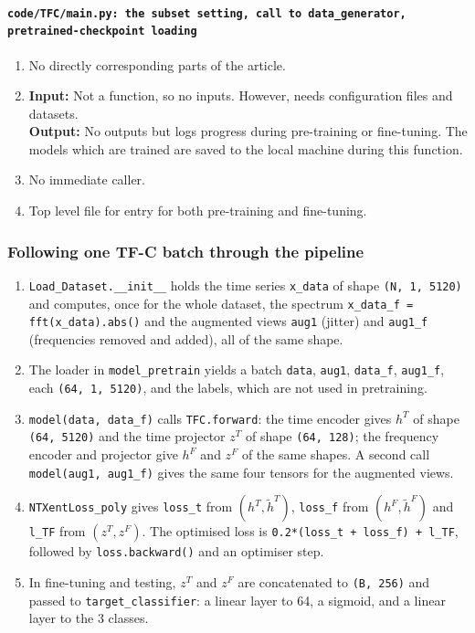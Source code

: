 \documentclass[a4paper,11pt]{article}
\newcommand{\code}[1]{\texttt{#1}}
\begin{document}
\paragraph{\code{code/TFC/main.py: the \code{subset} setting, call to \code{data\_generator}, pretrained-checkpoint loading}}
\begin{enumerate}[label=(\roman*)]
\item No directly corresponding parts of the article.
\item 
    \textbf{Input:} Not a function, so no inputs. However, needs configuration files and datasets.\\
    \textbf{Output:} No outputs but logs progress during pre-training or fine-tuning. The models which are trained are saved to the local machine during this function.
\item No immediate caller.
\item Top level file for entry for both pre-training and fine-tuning.
\end{enumerate}

\subsubsection{Following one TF-C batch through the pipeline}
\begin{enumerate}
\item \code{Load\_Dataset.\_\_init\_\_} holds the time series \code{x\_data} of shape \texttt{(N, 1, 5120)} and computes, once for the whole dataset, the spectrum \code{x\_data\_f = fft(x\_data).abs()} and the augmented views \code{aug1} (jitter) and \code{aug1\_f} (frequencies removed and added), all of the same shape.
\item The loader in \code{model\_pretrain} yields a batch \code{data}, \code{aug1}, \code{data\_f}, \code{aug1\_f}, each \texttt{(64, 1, 5120)}, and the labels, which are not used in pretraining.
\item \code{model(data, data\_f)} calls \code{TFC.forward}: the time encoder gives $h^T$ of shape \texttt{(64, 5120)} and the time projector $z^T$ of shape \texttt{(64, 128)}; the frequency encoder and projector give $h^F$ and $z^F$ of the same shapes. A second call \code{model(aug1, aug1\_f)} gives the same four tensors for the augmented views.
\item \code{NTXentLoss\_poly} gives \code{loss\_t} from $(h^T, \tilde{h}^T)$, \code{loss\_f} from $(h^F, \tilde{h}^F)$ and \code{l\_TF} from $(z^T, z^F)$. The optimised loss is \code{0.2*(loss\_t + loss\_f) + l\_TF}, followed by \code{loss.backward()} and an optimiser step.
\item In fine-tuning and testing, $z^T$ and $z^F$ are concatenated to \texttt{(B, 256)} and passed to \code{target\_classifier}: a linear layer to 64, a sigmoid, and a linear layer to the 3 classes.
\end{enumerate}
\end{document}
